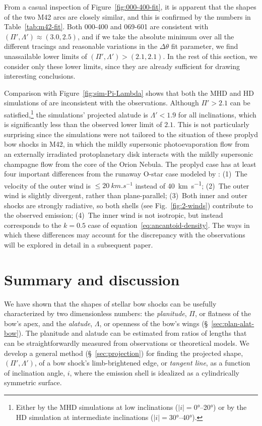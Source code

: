 \documentclass[useAMS, usenatbib, a4paper]{mnras}
\providecommand{\abs}[1]{\lvert#1\rvert}
\begin{document}
From a casual inspection of Figure~\ref{fig:000-400-fit}, it is
apparent that the shapes of the two M42 arcs are closely similar, and
this is confirmed by the numbers in Table~\ref{tab:m42-fit}. Both
000-400 and 069-601 are consistent with
\((\Pi', \Lambda') \approx (3.0, 2.5)\), and if we take the absolute minimum over
all the different tracings and reasonable variations in the
\(\Delta\theta\) fit parameter, we find unassailable lower limits of
\((\Pi', \Lambda') > (2.1, 2.1)\).  In the rest of this section, we consider
only these lower limits, since they are already sufficient for drawing
interesting conclusions.

Comparison with Figure~\ref{fig:sim-Pi-Lambda} shows that both the MHD
and HD simulations of \citet{Meyer:2016a} are inconsistent with the
observations.  Although \(\Pi' > 2.1\) can be satisfied,\footnote{%
  Either by the MHD simulations at low inclinations
  (\(\abs{i} = \ang{0}\)--\ang{20}) or by the HD simulation at
  intermediate inclinations (\(\abs{i} = \ang{30}\)--\ang{40}).} %
the simulations' projected alatude is \(\Lambda' < 1.9\) for all
inclinations, which is significantly less than the observed lower
limit of \(2.1\).  This is not particularly surprising since the
simulations were not tailored to the situation of these proplyd bow
shocks in M42, in which the mildly supersonic photoevaporation flow
from an externally irradiated protoplanetary disk interacts with the
mildly supersonic champagne flow from the core of the Orion Nebula.
The proplyd case has at least four important differences from the
runaway O-star case modeled by \citet{Meyer:2016a}: (1)~The velocity
of the outer wind is \(\le \SI{20}{km.s^{-1}}\) instead of
\SI{40}{km.s^{-1}}; (2)~The outer wind is slightly divergent, rather
than plane-parallel; (3)~Both inner and outer shocks are strongly
radiative, so both shells (see Fig.~\ref{fig:2-winds}) contribute to
the observed emission; (4)~The inner wind is not isotropic, but
instead corresponds to the \(k = 0.5\) case of
equation~\eqref{eq:ancantoid-density}.  The ways in which these
differences may account for the discrepancy with the observations will
be explored in detail in a subsequent paper.

\section{Summary and discussion}
\label{sec:conc}

We have shown that the shapes of stellar bow shocks can be usefully
characterized by two dimensionless numbers: the \textit{planitude},
\(\Pi\), or flatness of the bow's apex, and the \textit{alatude},
\(\Lambda\), or openness of the bow's wings (\S~\ref{sec:plan-alat-bow}).
The planitude and alatude can be estimated from ratios of lengths that
can be straightforwardly measured from observations or theoretical
models.  We develop a general method (\S~\ref{sec:projection}) for
finding the projected shape, \((\Pi', \Lambda')\), of a bow shock's
limb-brightened edge, or \textit{tangent line}, as a function of
inclination angle, \(i\), where the emission shell is idealized as a
cylindrically symmetric surface.
\end{document}
